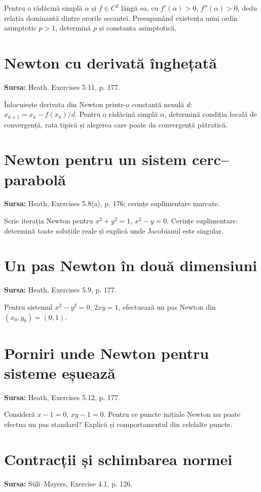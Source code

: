 \documentclass[11pt,a4paper]{article}
\begin{document}
Pentru o rădăcină simplă $\alpha$ și $f\in C^2$ lângă ea, cu $f'(\alpha)>0$, $f''(\alpha)>0$, dedu relația dominantă dintre erorile secantei. Presupunând existența unui ordin asimptotic $p>1$, determină $p$ și constanta asimptotică.



\section{Newton cu derivată înghețată}
\textbf{Sursa:} Heath, Exercises 5.11, p. 177.

Înlocuiește derivata din Newton printr-o constantă nenulă $d$: $x_{k+1}=x_k-f(x_k)/d$. Pentru o rădăcină simplă $\alpha$, determină condiția locală de convergență, rata tipică și alegerea care poate da convergență pătratică.



\section{Newton pentru un sistem cerc--parabolă}
\textbf{Sursa:} Heath, Exercises 5.8(a), p. 176; cerințe suplimentare marcate.

Scrie iterația Newton pentru $x^2+y^2=1$, $x^2-y=0$. Cerințe suplimentare: determină toate soluțiile reale și explică unde Jacobianul este singular.



\section{Un pas Newton în două dimensiuni}
\textbf{Sursa:} Heath, Exercises 5.9, p. 177.

Pentru sistemul $x^2-y^2=0$, $2xy=1$, efectuează un pas Newton din $(x_0,y_0)=(0,1)$.



\section{Porniri unde Newton pentru sisteme eșuează}
\textbf{Sursa:} Heath, Exercises 5.12, p. 177.

Consideră $x-1=0$, $xy-1=0$. Pentru ce puncte inițiale Newton nu poate efectua un pas standard? Explică și comportamentul din celelalte puncte.



\section{Contracții și schimbarea normei}
\textbf{Sursa:} Süli--Mayers, Exercise 4.1, p. 126.
\end{document}
